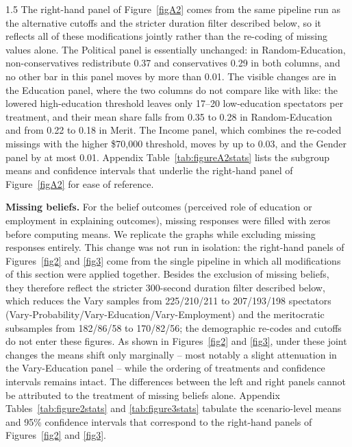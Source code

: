 \documentclass[12pt,a4paper]{article}
\begin{document}
\begin{spacing}{1.5}
The right-hand panel of Figure~\ref{figA2} comes from the same pipeline run as the alternative cutoffs and the stricter duration filter described below, so it reflects all of these modifications jointly rather than the re-coding of missing values alone. The Political panel is essentially unchanged: in Random-Education, non-conservatives redistribute 0.37 and conservatives 0.29 in both columns, and no other bar in this panel moves by more than 0.01. The visible changes are in the Education panel, where the two columns do not compare like with like: the lowered high-education threshold leaves only 17--20 low-education spectators per treatment, and their mean share falls from 0.35 to 0.28 in Random-Education and from 0.22 to 0.18 in Merit. The Income panel, which combines the re-coded missings with the higher \$70,000 threshold, moves by up to 0.03, and the Gender panel by at most 0.01. Appendix Table~\ref{tab:figureA2stats} lists the subgroup means and confidence intervals that underlie the right-hand panel of Figure~\ref{figA2} for ease of reference.

\medskip
\noindent\textbf{Missing beliefs.}
For the belief outcomes (perceived role of education or employment in explaining outcomes), missing responses were filled with zeros before computing means. We replicate the graphs while excluding missing responses entirely. This change was not run in isolation: the right-hand panels of Figures~\ref{fig2} and \ref{fig3} come from the single pipeline in which all modifications of this section were applied together. Besides the exclusion of missing beliefs, they therefore reflect the stricter 300-second duration filter described below, which reduces the Vary samples from 225/210/211 to 207/193/198 spectators (Vary-Probability/Vary-Education/Vary-Employment) and the meritocratic subsamples from 182/86/58 to 170/82/56; the demographic re-codes and cutoffs do not enter these figures. As shown in Figures~\ref{fig2} and \ref{fig3}, under these joint changes the means shift only marginally -- most notably a slight attenuation in the Vary-Education panel -- while the ordering of treatments and confidence intervals remains intact. The differences between the left and right panels cannot be attributed to the treatment of missing beliefs alone. Appendix Tables~\ref{tab:figure2stats} and \ref{tab:figure3stats} tabulate the scenario-level means and 95\% confidence intervals that correspond to the right-hand panels of Figures~\ref{fig2} and \ref{fig3}.


\end{spacing}
\end{document}
